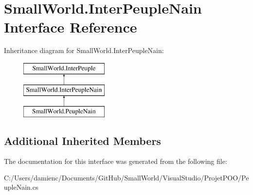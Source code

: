 \hypertarget{interface_small_world_1_1_inter_peuple_nain}{\section{Small\-World.\-Inter\-Peuple\-Nain Interface Reference}
\label{interface_small_world_1_1_inter_peuple_nain}
}
Inheritance diagram for Small\-World.\-Inter\-Peuple\-Nain\-:\begin{figure}[H]
\begin{center}
\leavevmode
\includegraphics[height=3.000000cm]{interface_small_world_1_1_inter_peuple_nain}
\end{center}
\end{figure}
\subsection*{Additional Inherited Members}


The documentation for this interface was generated from the following file\-:\begin{DoxyCompactItemize}
\item 
C\-:/\-Users/damienc/\-Documents/\-Git\-Hub/\-Small\-World/\-Visual\-Studio/\-Projet\-P\-O\-O/Peuple\-Nain.\-cs\end{DoxyCompactItemize}
